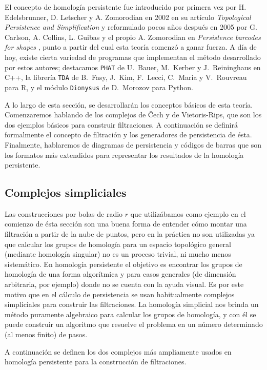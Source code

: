 \documentclass[12pt,a4paper,twoside]{article} %
\theoremstyle{plain}
\theoremstyle{definition}
\begin{document}
El concepto de homología persistente fue introducido por primera vez por H. Edelsbrunner, D. Letscher y A. Zomorodian en 2002 en su artículo \emph{Topological Persistence and Simplification} \cite{Edelsbrunner} y reformulado pocos años después en 2005 por G. Carlson, A. Collins, L. Guibas y el propio A. Zomorodian en \emph{Persistence barcodes for shapes} \cite{Carlsson}, punto a partir del cual esta teoría comenzó a ganar fuerza. A día de hoy, existe cierta variedad de programas que implementan el método desarrollado por estos autores; destacamos \texttt{PHAT} de U.~Bauer, M.~Kerber y J.~Reininghaus en C++, la librería \texttt{TDA} de B.~Fasy, J.~Kim, F.~Lecci, C.~Maria y V.~Rouvreau para R, y el módulo \texttt{Dionysus} de D.~Morozov para Python.

A lo largo de esta sección, se desarrollarán los conceptos básicos de esta teoría. Comenzaremos hablando de los complejos de Čech y de Vietoris-Rips, que son los dos ejemplos básicos para construir filtraciones. A continuación se definirá formalmente el concepto de filtración y los generadores de persistencia de ésta. Finalmente, hablaremos de diagramas de persistencia y códigos de barras que son los formatos más extendidos para representar los resultados de la homología persistente.

\subsection{Complejos simpliciales}
Las construcciones por bolas de radio $r$ que utilizábamos como ejemplo en el comienzo de ésta sección son una buena forma de entender cómo montar una filtración a partir de la nube de puntos, pero en la práctica no son utilizadas ya que calcular los grupos de homología para un espacio topológico general (mediante homología singular) no es un proceso trivial, ni mucho menos sistemático. En homología persistente el objetivo es encontrar los grupos de homología de una forma algorítmica y para casos generales (de dimensión arbitraria, por ejemplo) donde no se cuenta con la ayuda visual. Es por este motivo que en el cálculo de persistencia se usan habitualmente complejos simpliciales para construir las filtraciones. La homología simplicial nos brinda un método puramente algebraico para calcular los grupos de homología, y con él se puede construir un algoritmo que resuelve el problema en un número determinado (al menos finito) de pasos.

A continuación se definen los dos complejos más ampliamente usados en homología persistente para la construcción de filtraciones.
\end{document}
